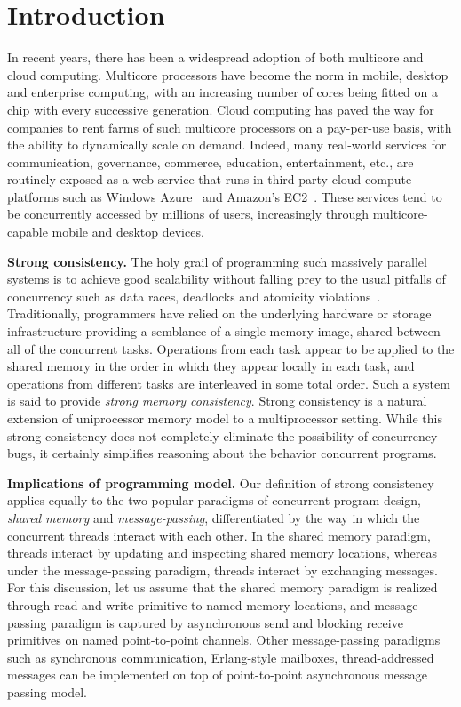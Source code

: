 \chapter{Introduction}

In recent years, there has been a widespread adoption of both multicore and
cloud computing. Multicore processors have become the norm in mobile, desktop
and enterprise computing, with an increasing number of cores being fitted on a
chip with every successive generation. Cloud computing has paved the way for
companies to rent farms of such multicore processors on a pay-per-use basis,
with the ability to dynamically scale on demand. Indeed, many real-world
services for communication, governance, commerce, education, entertainment,
etc., are routinely exposed as a web-service that runs in third-party cloud
compute platforms such as Windows Azure~\cite{Azure} and Amazon’s
EC2~\cite{Ec2}. These services tend to be concurrently accessed by millions of
users, increasingly through multicore-capable mobile and desktop devices.

\noindent \textbf{Strong consistency.} The holy grail of programming such
massively parallel systems is to achieve good scalability without falling prey
to the usual pitfalls of concurrency such as data races, deadlocks and
atomicity violations~\cite{Lu2008}. Traditionally, programmers have relied on
the underlying hardware or storage infrastructure providing a semblance of a
single memory image, shared between all of the concurrent tasks. Operations
from each task appear to be applied to the shared memory in the order in which
they appear locally in each task, and operations from different tasks are
interleaved in some total order. Such a system is said to provide \emph{strong
memory consistency}. Strong consistency is a natural extension of uniprocessor
memory model to a multiprocessor setting. While this strong consistency does
not completely eliminate the possibility of concurrency bugs, it certainly
simplifies reasoning about the behavior concurrent programs.

\noindent \textbf{Implications of programming model.} Our definition of strong
consistency applies equally to the two popular paradigms of concurrent program
design, \emph{shared memory} and \emph{message-passing}, differentiated by the
way in which the concurrent threads interact with each other. In the shared
memory paradigm, threads interact by updating and inspecting shared memory
locations, whereas under the message-passing paradigm, threads interact by
exchanging messages. For this discussion, let us assume that the shared memory
paradigm is realized through read and write primitive to named memory
locations, and message-passing paradigm is captured by asynchronous send and
blocking receive primitives on named point-to-point channels. Other
message-passing paradigms such as synchronous communication, Erlang-style
mailboxes, thread-addressed messages can be implemented on top of
point-to-point asynchronous message passing model.

